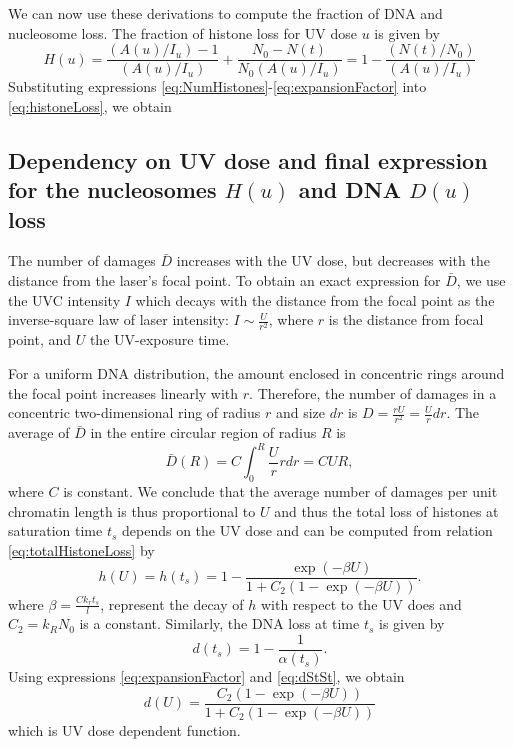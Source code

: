 \documentclass[12pt]{article}
\begin{document}
We can now use these derivations to compute the fraction of DNA and nucleosome loss. The fraction of histone loss for UV dose $u$ is given by
\begin{equation}\label{eq:histoneLoss}
H(u) = \frac{(A(u)/I_u)-1}{(A(u)/I_u)} +\frac{N_0-N(t)}{N_0(A(u)/I_u)}=1-\frac{(N(t)/N_0)}{(A(u)/I_u)}
\end{equation}
Substituting expressions \ref{eq:NumHistones}-\ref{eq:expansionFactor} into \ref{eq:histoneLoss}, we obtain

\subsection{Dependency on UV dose and final expression for the nucleosomes $H(u)$ and DNA $D(u)$ loss}

The number of damages $\bar{D}$ increases with the UV dose, but decreases with the distance from the laser's focal point. To obtain an exact expression for $\bar{D}$, we use the UVC intensity $I$ which decays with the distance from the focal point as the inverse-square law of laser intensity: $I \sim \frac{U}{r^2}$, where $r$ is the distance from focal point, and $U$ the UV-exposure time.

For a uniform DNA distribution, the amount enclosed in concentric rings around the focal point increases linearly with $r$. Therefore, the number of damages in a concentric two-dimensional ring of radius $r$ and size $dr$ is ${D}= \frac{rU}{r^2}=\frac{U}{r}dr$. The average of $\bar{D}$ in the entire circular region of radius $R$ is
\begin{equation*}
\bar{D}(R) = C\int_0^R \frac{U}{r} rdr = CUR,
\end{equation*}
where $C$ is constant. We conclude that the average number of damages per unit chromatin length is thus proportional to $U$ and thus the total loss of histones at saturation time $t_{s}$ depends on the UV dose and can be computed from relation \ref{eq:totalHistoneLoss} by
\begin{equation}\label{eq:totalHiostoneLossVsUV}
h(U)=h(t_s)=1-\frac{\exp(-\beta U)}{ 1+C_2(1-\exp(-\beta U))}.
\end{equation}
where $\beta=\frac{Ck_rt_s}{l}$, represent the decay of $h$ with respect to the UV does and $C_2=k_RN_0$ is a constant. Similarly, the DNA loss at time $t_{s}$ is given by
\begin{equation}\label{eq:dStSt}
d(t_s)= 1-\frac{1}{\alpha(t_s)}.
\end{equation}
Using expressions \ref{eq:expansionFactor} and \ref{eq:dStSt}, we obtain
\begin{equation}\label{eq:dnaLoss}
d(U)= \frac{C_2(1-\exp(-\beta U))}{1+C_2(1-\exp(-\beta U))}
\end{equation}
which is UV dose dependent function.
\end{document}
